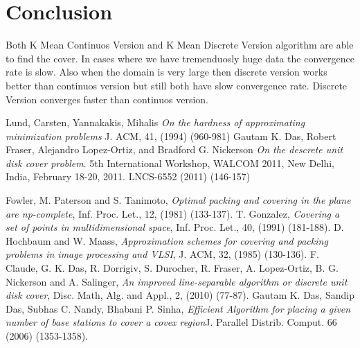 \documentclass[12pt,a4wide]{report}
\theoremstyle{plain}
\theoremstyle{definition}
\theoremstyle{remark}
\begin{document}
\section{Conclusion}
Both K Mean Continuos Version and K Mean Discrete Version algorithm are able to find the cover. In cases where we have
tremenduosly huge data the convergence rate is slow. Also when the domain is very large then discrete version works better
than continuos version but still both have slow convergence rate. Discrete Version converges faster than continuos version.
 
\clearpage

\begin{thebibliography}{10} 
  Lund, Carsten, Yannakakis, Mihalis \textit{On the hardness of approximating minimization problems} J. ACM, 
41, (1994) (960-981)
  Gautam K. Das, Robert Fraser, Alejandro Lopez-Ortiz, and Bradford G. Nickerson 
                \textit{On the descrete unit disk cover problem}. 5th International Workshop, WALCOM 2011, New Delhi, 
                India, February 18-20, 2011. LNCS-6552 (2011) (146-157)
          
 Fowler, M. Paterson and S. Tanimoto, \textit{Optimal packing and covering in the plane are np-complete}, Inf. Proc. 
               Let., 12, (1981) (133-137).
 T. Gonzalez, \textit{Covering a set of points in multidimensional space}, Inf. Proc. Let., 40, (1991) (181-188). 
 D. Hochbaum and W. Maass, \textit{Approximation schemes for covering and packing problems in image processing and VLSI}, 
         J. ACM, 32, (1985) (130-136).
 F. Claude, G. K. Das, R. Dorrigiv, S. Durocher, R. Fraser, A. Lopez-Ortiz, B. G. Nickerson and A. Salinger, 
                 \textit{An improved line-separable algorithm or discrete unit disk cover}, Disc. Math, Alg. and Appl., 2, (2010) (77-87).
 Gautam K. Das, Sandip Das, Subhas C. Nandy, Bhabani P. Sinha, \textit{Efficient Algorithm for placing a given number of base stations to cover a covex
             region}J. Parallel Distrib. Comput. 66 (2006) (1353-1358).


 \end{thebibliography}
 
\end{document}
